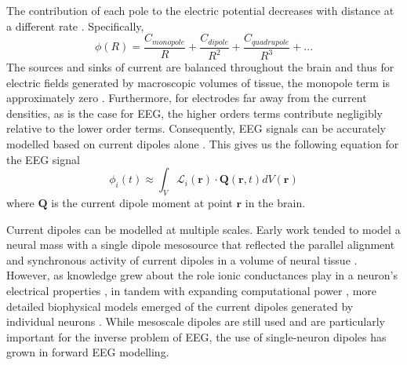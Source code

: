 The contribution of each pole to the electric potential decreases with distance at a different rate \cite{Nunez2006}. Specifically,
\begin{equation}
    \phi(R) = \frac{C_{monopole}}{R} + \frac{C_{dipole}}{R^2}  + \frac{C_{quadrupole}}{R^3}  + ...
\end{equation}
The sources and sinks of current are balanced throughout the brain and thus for electric fields generated by macroscopic volumes of tissue, the monopole term is approximately zero \cite{Nunez2006}. Furthermore, for electrodes far away from the current densities, as is the case for EEG, the higher orders terms contribute negligibly relative to the lower order terms. Consequently, EEG signals can be accurately modelled based on current dipoles alone \cite{Nunez2006,RevModPhys.65.413}. This gives us the following equation for the EEG signal \cite{RevModPhys.65.413}
\begin{equation} \label{eq:lead_solution}
    \phi_i(t) \approx \int_V \mathcal{L}_i(\bm{r}) \cdot \bm{Q}(\bm{r},t) dV(\bm{r})
\end{equation}
where $\bm{Q}$ is the current dipole moment at point $\bm{r}$ in the brain. 

Current dipoles can be modelled at multiple scales. Early work tended to model a neural mass with a single dipole mesosource that reflected the parallel alignment and synchronous activity of current dipoles in a volume of neural tissue \cite{Nunez2006}. However, as knowledge grew about the role ionic conductances play in a neuron's electrical properties \cite{Baxter1991}, in tandem with expanding computational power \cite{Beeman2013}, more detailed biophysical models emerged of the current dipoles generated by individual neurons \cite{Murakami2002,Murakami2003,Murakami2006,Jones2007}. While mesoscale dipoles are still used and are particularly important for the inverse problem of EEG, the use of single-neuron dipoles has grown in forward EEG modelling. 

